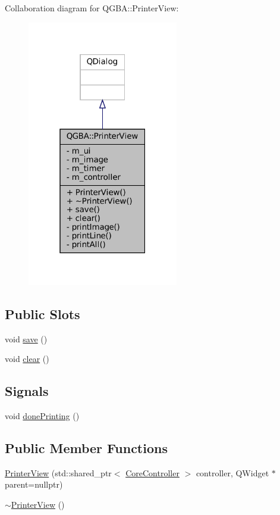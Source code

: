 Collaboration diagram for Q\+G\+BA\+:\+:Printer\+View\+:
\nopagebreak
\begin{figure}[H]
\begin{center}
\leavevmode
\includegraphics[width=187pt]{class_q_g_b_a_1_1_printer_view__coll__graph}
\end{center}
\end{figure}
\subsection*{Public Slots}
\begin{DoxyCompactItemize}
\item 
void \mbox{\hyperlink{class_q_g_b_a_1_1_printer_view_ae8e7d2e4df544c0f17b3fb34036038f7}{save}} ()
\item 
void \mbox{\hyperlink{class_q_g_b_a_1_1_printer_view_a92761518133141eb63987760778ec741}{clear}} ()
\end{DoxyCompactItemize}
\subsection*{Signals}
\begin{DoxyCompactItemize}
\item 
void \mbox{\hyperlink{class_q_g_b_a_1_1_printer_view_afae07552ce85ba81355434d6c949d46c}{done\+Printing}} ()
\end{DoxyCompactItemize}
\subsection*{Public Member Functions}
\begin{DoxyCompactItemize}
\item 
\mbox{\hyperlink{class_q_g_b_a_1_1_printer_view_a7145e3fa1fbb7d0d112aad28ee172131}{Printer\+View}} (std\+::shared\+\_\+ptr$<$ \mbox{\hyperlink{class_q_g_b_a_1_1_core_controller}{Core\+Controller}} $>$ controller, Q\+Widget $\ast$parent=nullptr)
\item 
\mbox{\hyperlink{class_q_g_b_a_1_1_printer_view_aa7d2a46ee714b3cedff0fd1c0df194c5}{$\sim$\+Printer\+View}} ()
\end{DoxyCompactItemize}
